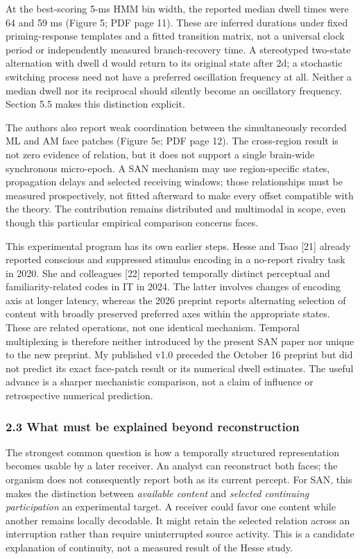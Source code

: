 \documentclass[
  american,
  11pt,
  letterpaper,
]{article}
\begin{document}
At the best-scoring 5-ms HMM bin width, the reported median dwell times were 64 and 59 ms (Figure 5; PDF page 11). These are inferred durations under fixed priming-response templates and a fitted transition matrix, not a universal clock period or independently measured branch-recovery time. A stereotyped two-state alternation with dwell d would return to its original state after 2d; a stochastic switching process need not have a preferred oscillation frequency at all. Neither a median dwell nor its reciprocal should silently become an oscillatory frequency. Section 5.5 makes this distinction explicit.

The authors also report weak coordination between the simultaneously recorded ML and AM face patches (Figure 5e; PDF page 12). The cross-region result is not zero evidence of relation, but it does not support a single brain-wide synchronous micro-epoch. A SAN mechanism may use region-specific states, propagation delays and selected receiving windows; those relationships must be measured prospectively, not fitted afterward to make every offset compatible with the theory. The contribution remains distributed and multimodal in scope, even though this particular empirical comparison concerns faces.

This experimental program has its own earlier steps. Hesse and Tsao {[}21{]} already reported conscious and suppressed stimulus encoding in a no-report rivalry task in 2020. She and colleagues {[}22{]} reported temporally distinct perceptual and familiarity-related codes in IT in 2024. The latter involves changes of encoding axis at longer latency, whereas the 2026 preprint reports alternating selection of content with broadly preserved preferred axes within the appropriate states. These are related operations, not one identical mechanism. Temporal multiplexing is therefore neither introduced by the present SAN paper nor unique to the new preprint. My published v1.0 preceded the October 16 preprint but did not predict its exact face-patch result or its numerical dwell estimates. The useful advance is a sharper mechanistic comparison, not a claim of influence or retrospective numerical prediction.

\subsubsection{2.3 What must be explained beyond reconstruction}\label{what-must-be-explained-beyond-reconstruction}

The strongest common question is how a temporally structured representation becomes usable by a later receiver. An analyst can reconstruct both faces; the organism does not consequently report both as its current percept. For SAN, this makes the distinction between \emph{available content} and \emph{selected continuing participation} an experimental target. A receiver could favor one content while another remains locally decodable. It might retain the selected relation across an interruption rather than require uninterrupted source activity. This is a candidate explanation of continuity, not a measured result of the Hesse study.
\end{document}
